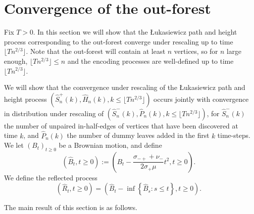 \section{Convergence of the out-forest}\label{sec.convoutforest}
 Fix $T>0$. In this section we will show that the \L ukasiewicz path and height process corresponding to the out-forest converge under rescaling up to time $\lfloor T n^{2/3}\rfloor$. Note that the out-forest will contain at least $n$ vertices, so for $n$ large enough, $\lfloor T n^{2/3}\rfloor\leq n$ and the encoding processes are well-defined up to time $\lfloor T n^{2/3}\rfloor$. 
 
We will show that the convergence under rescaling of the \L ukasiewicz path and height process $(\hat{S}^{+}_n(k),\hat{H}_n(k),k\leq \lfloor Tn^{2/3}\rfloor)$ occurs jointly with convergence in distribution under rescaling of $(\hat{S}^-_n(k),\hat{P}_n(k), k\leq \lfloor Tn^{2/3}\rfloor)$, for $\hat{S}^-_n(k)$ the number of unpaired in-half-edges of vertices that have been discovered at time $k$, and $\hat{P}_n(k)$ the number of dummy leaves added in the first $k$ time-steps.  \\
We let $(B_t)_{t\geq 0}$ be a Brownian motion, and define
$$(\hat{B}_t,t\geq 0):=\left( B_t-\frac{\sigma_{-+}+\nu_-}{2\sigma_+ \mu}t^2, t\geq 0\right).$$ 
We define the reflected process $$(\hat{R}_t,t\geq 0)= \left(\hat{B}_t-\inf\left\{\hat{B}_s: s\leq t\right\},t\geq 0\right).$$

The main result of this section is as follows. 

